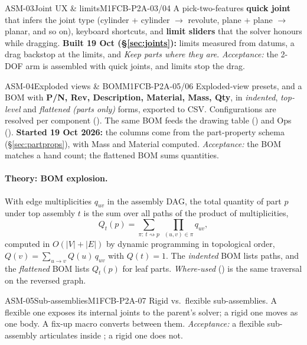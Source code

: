 





\begin{epic}{ASM-03}{Joint UX \& limits}{M1}{\stProg}{FCB-P2A-03/04}
A pick-two-features \textbf{quick joint} that infers the joint type (cylinder + cylinder $\rightarrow$
revolute, plane + plane $\rightarrow$ planar, and so on), keyboard shortcuts, and \textbf{limit sliders} that the
solver honours while dragging. \textbf{Built 19 Oct (\S\ref{sec:joints}):} limits measured from datums, a drag
backstop at the limits, and \emph{Keep parts where they are}.
\emph{Acceptance:} the 2-DOF arm is assembled with quick joints, and limits stop the drag.
\end{epic}

\begin{epic}{ASM-04}{Exploded views \& BOM}{M1}{\stProg}{FCB-P2A-05/06}
Exploded-view presets, and a BOM with \textbf{P/N, Rev, Description, Material, Mass, Qty}, in
\emph{indented}, \emph{top-level} and \emph{flattened (parts only)} forms, exported to CSV. Configurations are
resolved per component (). The same BOM feeds the drawing table () and Ops
().
\textbf{Started 19 Oct 2026:} the columns come from the part-property schema (\S\ref{sec:partprops}), with
Mass and Material computed.
\emph{Acceptance:} the  BOM matches a hand count; the flattened BOM sums quantities.
\end{epic}

\paragraph{Theory: BOM explosion.} With edge multiplicities $q_{uv}$ in the assembly DAG, the total quantity
of part $p$ under top assembly $t$ is the sum over all paths of the product of multiplicities,
\[
  Q_t(p) = \sum_{\pi:\,t\rightsquigarrow p}\ \prod_{(u,v)\in\pi} q_{uv},
\]
computed in $O(|V|+|E|)$ by dynamic programming in topological order, $Q(v)=\sum_{u\to v}Q(u)\,q_{uv}$ with
$Q(t)=1$. The \emph{indented} BOM lists paths, and the \emph{flattened} BOM lists $Q_t(p)$ for leaf parts.
\emph{Where-used} () is the same traversal on the reversed graph.

\begin{epic}{ASM-05}{Sub-assemblies}{M1}{\stTodo}{FCB-P2A-07}
Rigid vs.\ flexible sub-assemblies. A flexible one exposes its internal joints to the parent's solver; a
rigid one moves as one body. A fix-up macro converts between them.
\emph{Acceptance:} a flexible sub-assembly articulates inside ; a rigid one does not.
\end{epic}

